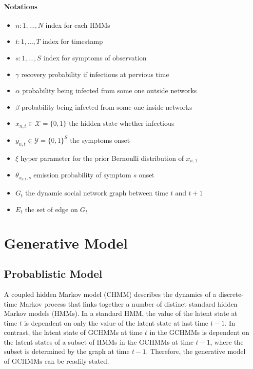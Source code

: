 \documentclass{article} %
\begin{document}
\paragraph{Notations}
\begin{itemize}
\item $n:1,\ldots,N$ index for each HMMs
\item $t:1,\ldots,T$ index for timestamp
\item $s:1,\ldots,S$ index for symptoms of observation
\item $\gamma$ recovery probability if infectious at pervious time
\item $\alpha$ probability being infected from some one outside networks
\item $\beta$ probability being infected from some one inside networks
\item $x_{n,t} \in \mathcal{X}=\{0,1\}$ the hidden state whether infectious
\item $y_{n,t} \in \mathcal{Y}=\{0,1\}^S$ the symptoms onset
\item $\xi$ hyper parameter for the prior Bernoulli distribution of $x_{n,1}$
\item $\theta_{x_{n,t},s}$ emission probability of symptom $s$ onset
\item $G_t$ the dynamic social network graph between time $t$ and $t+1$
\item $E_t$ the set of edge on $G_t$
\end{itemize}


\section{Generative Model}

\subsection{Probablistic Model}
A coupled hidden Markov model (CHMM) describes the dynamics of a discrete-time Markov process that links together a number of distinct standard hidden Markov models (HMMs). In a standard HMM, the value of the latent state at time $t$ is dependent on only the value of the latent state at last time $t-1$. In contrast, the latent state of GCHMMs at time $t$ in the GCHMMs is dependent on the latent states of a subset of HMMs in the GCHMMs at time $t-1$, where the subset is determined by the graph at time $t-1$. Therefore, the generative model of GCHMMs can be readily stated.
\end{document}
